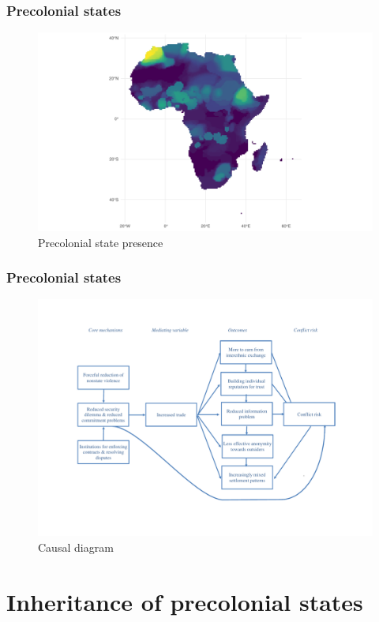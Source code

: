 \documentclass{beamer}
\begin{document}
\begin{frame}
\frametitle{Precolonial states} 

\begin{figure}[htpb]
	\centering
	\includegraphics[width=\linewidth]{../R/Output/sqrtSpAll.pdf}
	\caption{Precolonial state presence}%
	\label{sp}
\end{figure}
\end{frame}

\begin{frame}
\frametitle{Precolonial states} 

\begin{figure}[htpb]
	\centering
	\includegraphics[width=0.9\linewidth]{img/Causal diagram.pdf}
	\caption{Causal diagram}%
	\label{causal}
\end{figure}
\end{frame}

\section{Inheritance of precolonial states}
\end{document}
